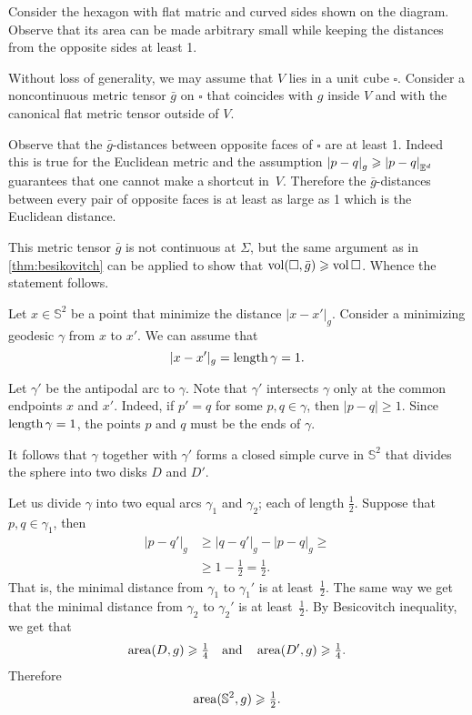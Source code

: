 Consider the hexagon with flat matric and curved sides shown on the diagram.
Observe that its area can be made arbitrary small while keeping the distances from the opposite sides at least 1.

Without loss of generality, we may assume that $V$ lies in a unit cube $\square$.
Consider a noncontinuous metric tensor $\bar g$ on $\square$ that coincides with $g$ inside $V$ and with the canonical flat metric tensor outside of $V$.

Observe that the $\bar g$-distances between opposite faces of $\square$ are at least 1.
Indeed this is true for the Euclidean metric and the assumption $\dist{p}{q}{g}\ge\dist{p}{q}{\EE^d}$  guarantees that one cannot make a shortcut in~$V$.
Therefore the $\bar g$-distances between every pair of opposite faces is at least as large as 1 which is the Euclidean distance.

This metric tensor $\bar g$ is not continuous at $\Sigma$, but the same argument as in \ref{thm:besikovitch} can be applied to show that $\operatorname{\rm vol}\nolimits(\square,\bar g)\geqslant \operatorname{\rm vol}\nolimits\square$.
Whence the statement follows.


Let $x\in \mathbb{S}^2$ be a point that minimize the distance $|x-x'|_g$.
Consider a minimizing geodesic $\gamma$ from $x$ to $x'$.
We can assume that 
\[|x-x'|_g=\mathop{\rm length}\nolimits \gamma=1.\]

Let $\gamma'$ be the antipodal arc to $\gamma$.
Note that $\gamma'$ intersects $\gamma$ only at the common endpoints $x$ and $x'$.
Indeed, if $p'=q$ for some $p,q\in\gamma$, then $|p-q|\ge 1$.
Since $\mathop{\rm length}\nolimits \gamma=1$, the points $p$ and $q$ must be the ends of $\gamma$.

It follows that $\gamma$ together with $\gamma'$ forms a closed simple curve in $\mathbb{S}^2$
that divides the sphere into two disks $D$ and $D'$.

Let us divide $\gamma$ into two equal arcs $\gamma_1$ and $\gamma_2$; each of length $\tfrac12$.
Suppose that $p,q\in\gamma_1$, then 
\begin{align*}
|p-q'|_g&\ge |q-q'|_g-|p-q|_g\ge
\\
&\ge 1-\tfrac12=\tfrac12.
\end{align*}
That is, the minimal distance from $\gamma_1$ to $\gamma_1'$ is at least~$\tfrac12$.
The same way we get that the minimal distance from $\gamma_2$ to $\gamma_2'$ is at least~$\tfrac12$.
By Besicovitch inequality, we get that 
\[\operatorname{\rm area}\nolimits(D,g)\geqslant \tfrac14\quad\text{and}\quad \operatorname{\rm area}\nolimits(D',g)\geqslant \tfrac14.\]
Therefore 
\[\operatorname{\rm area}\nolimits(\mathbb{S}^2,g)\geqslant\tfrac12.\]

